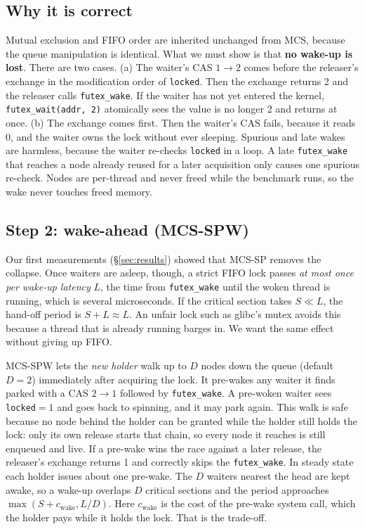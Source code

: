 \documentclass[10pt,twocolumn]{article}
\newcommand{\mcssp}{\textsc{MCS-SP}}
\begin{document}
\subsection{Why it is correct}
Mutual exclusion and FIFO order are inherited unchanged from MCS, because the queue manipulation is
identical. What we must show is that \textbf{no wake-up is lost}. There are two cases.
(a) The waiter's CAS $1\to2$ comes before the releaser's exchange in the modification order of
\texttt{locked}. Then the exchange returns 2 and the releaser calls \texttt{futex\_wake}. If the waiter has
not yet entered the kernel, \texttt{futex\_wait(addr, 2)} atomically sees the value is no longer 2 and
returns at once. (b) The exchange comes first. Then the waiter's CAS fails, because it reads 0, and the
waiter owns the lock without ever sleeping. Spurious and late wakes are harmless, because the waiter
re-checks \texttt{locked} in a loop. A late \texttt{futex\_wake} that reaches a node already reused for a
later acquisition only causes one spurious re-check. Nodes are per-thread and never freed while the
benchmark runs, so the wake never touches freed memory.

\subsection{Step 2: wake-ahead (\mcssp{}W)}
\label{sec:wake}
Our first measurements (\S\ref{sec:results}) showed that \mcssp{} removes the collapse. Once waiters are
asleep, though, a strict FIFO lock passes \emph{at most once per wake-up latency} $L$, the time from
\texttt{futex\_wake} until the woken thread is running, which is several microseconds. If the critical
section takes $S \ll L$, the hand-off period is $S+L \approx L$. An unfair lock such as glibc's mutex
avoids this because a thread that is already running barges in. We want the same effect without giving up FIFO.

\mcssp{}W lets the \emph{new holder} walk up to $D$ nodes down the queue (default $D=2$) immediately after
acquiring the lock. It pre-wakes any waiter it finds parked with a CAS $2\to1$ followed by
\texttt{futex\_wake}. A pre-woken waiter sees \texttt{locked}$=1$ and goes back to spinning, and it may park
again. This walk is safe because no node behind the holder can be granted while the holder still holds
the lock: only its own release starts that chain, so every node it reaches is still enqueued and live. If a
pre-wake wins the race against a later release, the releaser's exchange returns 1 and correctly skips the
\texttt{futex\_wake}. In steady state each holder issues about one pre-wake. The $D$ waiters nearest the
head are kept awake, so a wake-up overlaps $D$ critical sections and the period approaches
$\max(S + c_{\text{wake}}, L/D)$. Here $c_{\text{wake}}$ is the cost of the pre-wake system call, which
the holder pays while it holds the lock. That is the trade-off.
\end{document}
